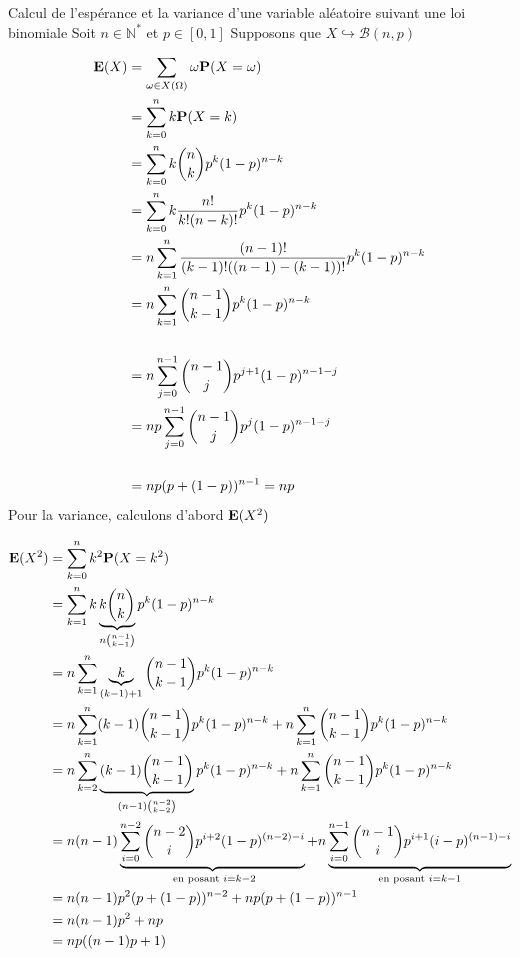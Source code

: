 \documentclass{article}
\renewenvironment{question_kholle}[2][ ]
{
	\subsection{\texorpdfstring{#2}{}}
	\notblank{#1}
	{
		\noindent #1
		\bigbreak
	}
	{}
	\begin{proof}
}
{
	\end{proof}
}
\begin{document}
\begin{question_kholle}{Calcul de l'espérance et la variance d'une variable aléatoire suivant une loi binomiale}
	Soit $n \in \mathbb{N}^*$ et $p \in [0, 1]$
	Supposons que $X \hookrightarrow \mathcal{B}(n, p)$
	
	\begin{align*}
		\mathbf E(X) &= \sum_{\omega \in X(\Omega)}\omega \mathbf P(X = \omega) \\
		& = \sum_{k=0}^{n}k\mathbf P(X=k) \\
		&= \sum_{k=0}^{n}k \binom{n}{k} p^{k}(1-p)^{n-k} \\
		&= \sum_{k=0}^{n}k \frac{n!}{k! (n-k)!} p^{k}(1-p)^{n-k} \\
		&= n \sum_{k=1}^{n} \frac{(n-1)!}{(k-1)! ((n-1)-(k-1))!} p^{k}(1-p)^{n-k} \\
		&= n \sum_{k=1}^{n} \binom{n-1}{k-1} p^{k}(1-p)^{n-k} \\ \\
		&= n \sum_{j=0}^{n-1} \binom{n-1}{j} p^{j+1}(1-p)^{n-1-j} \\
		&= n p \sum_{j=0}^{n-1} \binom{n-1}{j} p^{j}(1-p)^{n-1-j} \\ \\
		&= np (p + (1-p))^{n-1} = np
	\end{align*}
	Pour la variance, calculons d'abord $\mathbf E(X^{2})$
	
	\begin{align*}
		\mathbf E(X^{2}) &= \sum _{k=0}^{n}k^{2} \mathbf P(X=k^{2}) \\
		&=  \sum_{k=1}^{n} k \underbrace{ k \binom{n}{k} }_{ n \binom{n-1}{k-1} }p^{k}(1-p)^{n-k} \\
		&= n \sum_{k=1}^{n} \underbrace{ k }_{ (k-1)+1 } \binom{n-1}{k-1} p^{k}(1-p)^{n-k} \\
		&= n \sum_{k=1}^{n}(k-1)\binom{n-1}{k-1}p^{k}(1-p)^{n-k}+ n \sum_{k=1}^{n}\binom{n-1}{k-1}p^{k}(1-p)^{n-k} \\
		&= n \sum_{k=2}^{n}\underbrace{ (k-1)\binom{n-1}{k-1} }_{ (n-1)\binom{n-2}{k-2} } p^{k}(1-p)^{n-k} + n \sum_{k=1}^{n}\binom{n-1}{k-1}p^{k}(1-p)^{n-k} \\
		&= n(n-1) \underbrace{ \sum_{i=0}^{n-2}\binom{n-2}{i}p^{i+2}(1-p)^{(n-2)-i}  }_{ \text{ en posant } i = k-2 }+ n \underbrace{ \sum_{i=0}^{n-1}\binom{n-1}{i}p^{i+1}(i-p)^{(n-1)-i} }_{ \text{en posant }i=k-1 } \\
		&= n(n-1)p^{2}(p+(1-p))^{n-2} + np(p+(1-p))^{n-1} \\
		&= n(n-1)p^{2}+np \\
		&= np((n-1)p+1)
	\end{align*}
	

\end{question_kholle}
\end{document}
